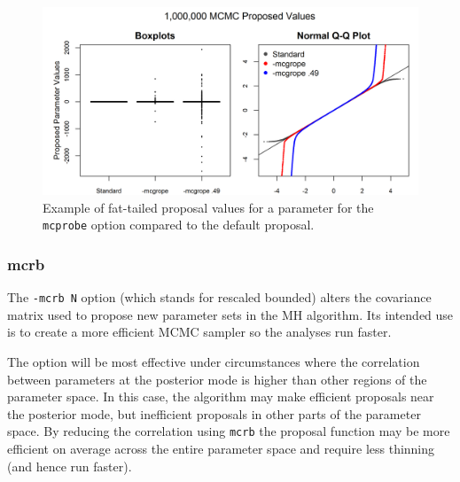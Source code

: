 \documentclass{article}\usepackage[]{graphicx}\usepackage[]{color}
\begin{document}
\begin{figure}[h]
  \centering
  \includegraphics[width=5in]{../plots/mcgrope_example.png}
  \caption{Example of fat-tailed proposal values for a
    parameter for the \texttt{mcprobe} option compared to
    the default proposal.}
  \label{fig:mcgrope_example}
\end{figure}

\subsubsection{mcrb}\label{sec:mcrb}
The \texttt{-mcrb N} option (which stands for rescaled
bounded) alters the covariance matrix used to propose new
parameter sets in the MH algorithm. Its intended use is to
create a more efficient MCMC sampler so the analyses run
faster.

The option will be most effective under circumstances where
the correlation between parameters at the posterior mode is
higher than other regions of the parameter space. In this
case, the algorithm may make efficient proposals near the
posterior mode, but inefficient proposals in other parts of
the parameter space. By reducing the correlation using
\texttt{mcrb} the proposal function may be more efficient on
average across the entire parameter space and require less
thinning (and hence run faster).
\end{document}
